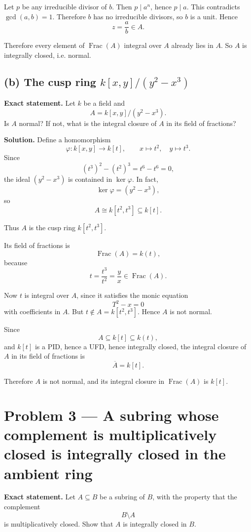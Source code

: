 \documentclass[12pt,a4paper]{article}
\theoremstyle{notespace}
\begin{document}
Let \(p\) be any irreducible divisor of \(b\). Then \(p\mid a^n\), hence \(p\mid a\). This contradicts \(\gcd(a,b)=1\). Therefore \(b\) has no irreducible divisors, so \(b\) is a unit. Hence
\[
z=\frac{a}{b}\in A.
\]

Therefore every element of \(\operatorname{Frac}(A)\) integral over \(A\) already lies in \(A\). So \(A\) is integrally closed, i.e. normal.

\subsection*{(b) The cusp ring \texorpdfstring{$k[x,y]/(y^2-x^3)$}{k[x,y]/(y\string^2-x\string^3)}}

\textbf{Exact statement.}
Let \(k\) be a field and
\[
A=k[x,y]/(y^2-x^3).
\]
Is \(A\) normal? If not, what is the integral closure of \(A\) in its field of fractions?

\textbf{Solution.}
Define a homomorphism
\[
\varphi:k[x,y]\to k[t],\qquad x\mapsto t^2,\quad y\mapsto t^3.
\]
Since
\[
(t^3)^2-(t^2)^3=t^6-t^6=0,
\]
the ideal \((y^2-x^3)\) is contained in \(\ker\varphi\). In fact,
\[
\ker\varphi=(y^2-x^3),
\]
so
\[
A\cong k[t^2,t^3]\subseteq k[t].
\]

Thus \(A\) is the cusp ring \(k[t^2,t^3]\).

Its field of fractions is
\[
\operatorname{Frac}(A)=k(t),
\]
because
\[
t=\frac{t^3}{t^2}=\frac{y}{x}\in \operatorname{Frac}(A).
\]

Now \(t\) is integral over \(A\), since it satisfies the monic equation
\[
T^2-x=0
\]
with coefficients in \(A\). But \(t\notin A=k[t^2,t^3]\). Hence \(A\) is not normal.

Since
\[
A\subseteq k[t]\subseteq k(t),
\]
and \(k[t]\) is a PID, hence a UFD, hence integrally closed, the integral closure of \(A\) in its field of fractions is
\[
\overline{A}=k[t].
\]

Therefore \(A\) is not normal, and its integral closure in \(\operatorname{Frac}(A)\) is \(k[t]\).	


\section{Problem 3 --- A subring whose complement is multiplicatively closed is integrally closed in the ambient ring}

\textbf{Exact statement.}
Let \(A\subseteq B\) be a subring of \(B\), with the property that the complement
\[
B\setminus A
\]
is multiplicatively closed. Show that \(A\) is integrally closed in \(B\).
\end{document}
